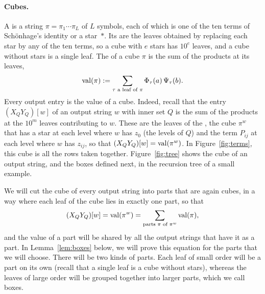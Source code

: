\paragraph{Cubes.}
A  is a string $\pi=\pi_1\cdots\pi_L$ of $L$ symbols, each of which is one of the ten terms of Sch\"onhage's identity or a star~$\ast$. Its  are the leaves obtained by replacing each star by any of the ten terms, so a cube with $e$ stars has $10^e$ leaves, and a cube without stars is a single leaf. The  of a cube $\pi$ is the sum of the products at its leaves,
\[
\mathrm{val}(\pi):=\sum_{\tau\text{ a leaf of }\pi}\Phi_\tau(a)\,\Psi_\tau(b).
\]
Every output entry is the value of a cube. Indeed, recall that the entry $(X_QY_Q)[w]$ of an output string $w$ with inner set $Q$ is the sum of the products at the $10^m$ leaves contributing to $w$. These are the leaves of the , the cube $\pi^w$ that has a star at each level where $w$ has $z_0$ (the levels of $Q$) and the term $P_{ij}$ at each level where $w$ has $z_{ij}$, so that $(X_QY_Q)[w]=\mathrm{val}(\pi^w)$. In Figure~\ref{fig:terms}, this cube is all the rows taken together. Figure~\ref{fig:tree} shows the cube of an output string, and the boxes defined next, in the recursion tree of a small example.

We will cut the cube of every output string into parts that are again cubes, in a way where each leaf of the cube lies in exactly one part, so that
\[
(X_QY_Q)[w]=\mathrm{val}(\pi^w)=\sum_{\text{parts }\pi\text{ of }\pi^w}\mathrm{val}(\pi),
\]
and the value of a part will be shared by all the output strings that have it as a part. In Lemma~\ref{lem:boxes} below, we will prove this equation for the parts that we will choose. There will be two kinds of parts. Each leaf of small order will be a part on its own (recall that a single leaf is a cube without stars), whereas the leaves of large order will be grouped together into larger parts, which we call boxes.

